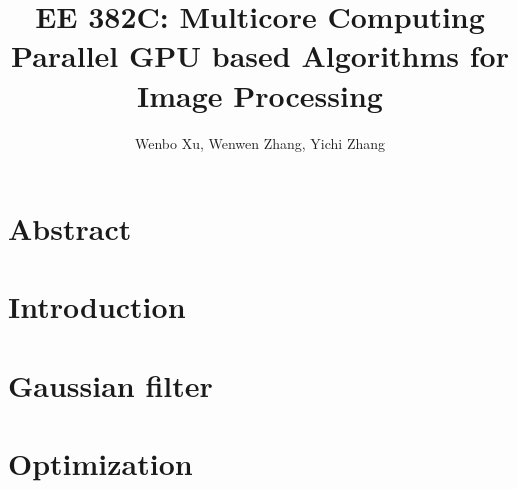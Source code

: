 \documentclass[journal,12pt,onecolumn,draftclsnofoot]{ieeeconf}  %
\author{Wenbo Xu, Wenwen Zhang, Yichi Zhang}
\title{
	EE 382C: Multicore Computing \protect\\
	\Large \bf Parallel GPU based Algorithms for Image Processing
}
\begin{document}
\maketitle
\thispagestyle{empty}
\pagestyle{empty}


\section{Abstract}
  

\section{Introduction}

\section{Gaussian filter}

\section{Optimization}
\end{document}

